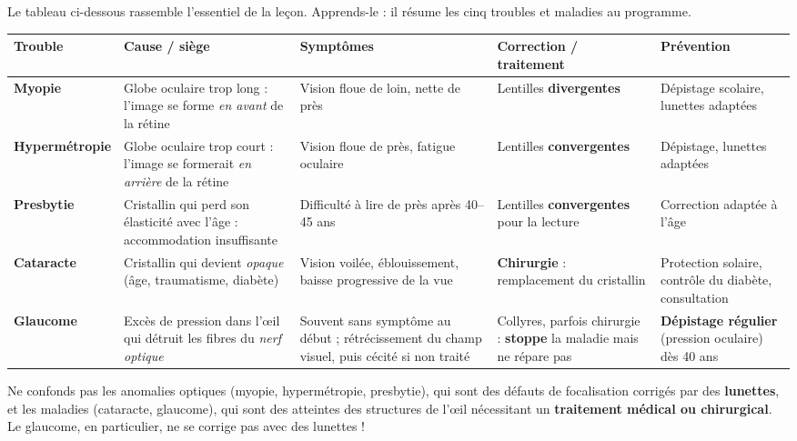 \documentclass[11pt]{article}
\newcommand{\cle}[1]{{\popxbold\color{popdark}#1}}
\newcounter{popsec}
\newcounter{popsub}
\newcommand{\courssub}[1]{%
  \stepcounter{popsub}%
  \par\vspace{9pt}\noindent{\popxbold\fontsize{11.5}{13}\selectfont\color{popink}{\color{poporange}\thepopsec.\thepopsub}\hspace{6pt}#1}\par\nopagebreak\vspace{4pt}
}
\begin{document}
\courssub{Tableau récapitulatif général}

Le tableau ci-dessous rassemble l'essentiel de la leçon. Apprends-le : il résume les cinq troubles et maladies au programme.

\begin{center}
\small
\begin{tabularx}{\linewidth}{|l|X|X|X|X|}
\hline
\rowcolor{popblueL} \textbf{Trouble} & \textbf{Cause / siège} & \textbf{Symptômes} & \textbf{Correction / traitement} & \textbf{Prévention} \\
\hline
\textbf{Myopie} & Globe oculaire trop long : l'image se forme \emph{en avant} de la rétine & Vision floue de loin, nette de près & Lentilles \textbf{divergentes} & Dépistage scolaire, lunettes adaptées \\
\hline
\textbf{Hypermétropie} & Globe oculaire trop court : l'image se formerait \emph{en arrière} de la rétine & Vision floue de près, fatigue oculaire & Lentilles \textbf{convergentes} & Dépistage, lunettes adaptées \\
\hline
\textbf{Presbytie} & Cristallin qui perd son élasticité avec l'âge : accommodation insuffisante & Difficulté à lire de près après 40--45 ans & Lentilles \textbf{convergentes} pour la lecture & Correction adaptée à l'âge \\
\hline
\textbf{Cataracte} & Cristallin qui devient \emph{opaque} (âge, traumatisme, diabète) & Vision voilée, éblouissement, baisse progressive de la vue & \textbf{Chirurgie} : remplacement du cristallin & Protection solaire, contrôle du diabète, consultation \\
\hline
\textbf{Glaucome} & Excès de pression dans l'œil qui détruit les fibres du \emph{nerf optique} & Souvent sans symptôme au début ; rétrécissement du champ visuel, puis cécité si non traité & Collyres, parfois chirurgie : \textbf{stoppe} la maladie mais ne répare pas & \textbf{Dépistage régulier} (pression oculaire) dès 40 ans \\
\hline
\end{tabularx}
\end{center}

\begin{attention}
Ne confonds pas les \cle{anomalies optiques} (myopie, hypermétropie, presbytie), qui sont des défauts de focalisation corrigés par des \textbf{lunettes}, et les \cle{maladies} (cataracte, glaucome), qui sont des atteintes des structures de l'œil nécessitant un \textbf{traitement médical ou chirurgical}. Le glaucome, en particulier, ne se corrige pas avec des lunettes !
\end{attention}
\end{document}
